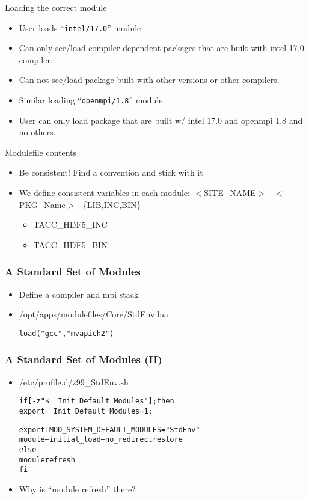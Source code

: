 \documentclass[dvipsnames,aspectratio=169]{beamer}
\begin{document}
\begin{frame}{Loading the correct module}
  \begin{itemize}
    \item User loads ``\texttt{intel/17.0}'' module
    \item Can only see/load compiler dependent packages that are built with
      intel 17.0 compiler.
    \item Can not see/load package built with other versions or other compilers.
    \item Similar loading ``\texttt{openmpi/1.8}'' module.
    \item User can only load package that are built w/ intel 17.0 and
      openmpi 1.8 and no others.
  \end{itemize}
\end{frame}


\begin{frame}{Modulefile contents}
  \begin{itemize}
    \item Be consistent! Find a convention and stick with it
    \item We define consistent variables in each module:
      $<$SITE\_NAME$>$\_$<$PKG\_Name$>$\_\{LIB,INC,BIN\}
      \begin{itemize}
        \item TACC\_HDF5\_INC
        \item TACC\_HDF5\_BIN
      \end{itemize}
  \end{itemize}
\end{frame}


\begin{frame}[fragile]
    \frametitle{A Standard Set of Modules}
  \begin{itemize}
    \item Define a compiler and mpi stack
    \item /opt/apps/modulefiles/Core/StdEnv.lua
  {\small
    \begin{alltt}
load("gcc","mvapich2")
    \end{alltt}
}
  \end{itemize}
\end{frame}


\begin{frame}[fragile]
    \frametitle{A Standard Set of Modules (II)}
  \begin{itemize}
    \item /etc/profile.d/z99\_StdEnv.sh
  {\small
    \begin{alltt}
   if [ -z "\$\_\_Init\_Default\_Modules" ]; then
      export \_\_Init\_Default\_Modules=1;

      export LMOD\_SYSTEM\_DEFAULT\_MODULES="StdEnv"
      module --initial\_load --no\_redirect restore
   else
      module refresh
   fi
    \end{alltt}
}
    \item Why is  ``module refresh'' there?
  \end{itemize}
\end{frame}
\end{document}
